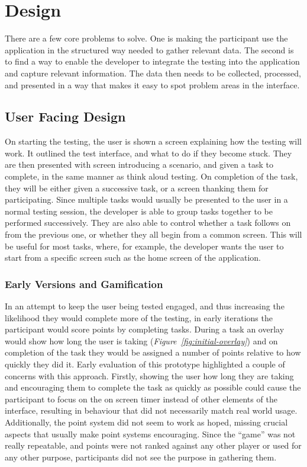 \chapter{Design}

There are a few core problems to solve.
One is making the participant use the application in the structured way needed to
gather relevant data. The second is to find a way to enable the developer to integrate
the testing into the application and capture relevant information. The data then needs
to be collected, processed, and presented in a way that makes it easy to spot
problem areas in the interface.

\section{User Facing Design}

On starting the testing, the user is shown a screen explaining how the testing
will work. It outlined the test interface, and what to do if they become stuck.
They are then presented with screen introducing a scenario, and given a task to 
complete, in the same manner as think aloud testing. On
completion of the task, they will be either given a successive task, or a screen
thanking them for participating. Since multiple tasks would usually be presented to the user in a normal testing session, the developer is able to group tasks together to be performed successively. They are also able to control whether a task follows on from the previous one, or whether they all begin from a common screen. This will be useful for most tasks, where, for example, the developer wants the user to start from a specific screen such as the home screen of the application.

\subsection{Early Versions and Gamification}

In an attempt to keep the user being tested engaged, and thus increasing the likelihood they would complete more of the testing, in early iterations the participant would score points by completing tasks. During a task an overlay would show how long the user is taking (\emph{Figure~\ref{fig:initial-overlay}}) and on completion of the task
they would be assigned a number of points relative to how quickly they did it.
Early evaluation of this prototype highlighted a couple of concerns with this approach. Firstly, showing the user how
long they are taking and encouraging them to complete the task as quickly as
possible could cause the participant to focus on the on screen timer instead of other elements of the interface, resulting in behaviour that did not necessarily match real world usage.
Additionally, the point system did not seem to work as hoped, missing crucial aspects that usually make point systems encouraging.  Since the ``game'' was not really repeatable, and points were not ranked against any other player or used for any other purpose, participants did not see the purpose in gathering them. 

